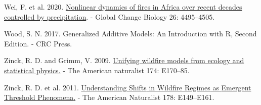 \documentclass[
]{article}
\newlength{\cslhangindent}
\newenvironment{CSLReferences}[2] %
 {\begin{list}{}{%
  \setlength{\itemindent}{0pt}
  \setlength{\leftmargin}{0pt}
  \setlength{\parsep}{0pt}
  \ifodd #1
   \setlength{\leftmargin}{\cslhangindent}
   \setlength{\itemindent}{-1\cslhangindent}
  \fi
  \setlength{\itemsep}{#2\baselineskip}}}
 {\end{list}}
\begin{document}
\begin{CSLReferences}{1}{1}
Wei, F. et al. 2020. \href{https://doi.org/10.1111/gcb.15190}{Nonlinear
dynamics of fires in {Africa} over recent decades controlled by
precipitation}. - Global Change Biology 26: 4495--4505.

Wood, S. N. 2017. Generalized {Additive Models}: {An Introduction} with
{R}, {Second Edition}. - {CRC Press}.

Zinck, R. D. and Grimm, V. 2009.
\href{https://doi.org/10.1086/605959}{Unifying wildfire models from
ecology and statistical physics.} - The American naturalist 174:
E170--85.

Zinck, R. D. et al. 2011.
\href{https://doi.org/10.1086/662675}{Understanding {Shifts} in
{Wildfire Regimes} as {Emergent Threshold Phenomena}.} - The American
Naturalist 178: E149--E161.

\end{CSLReferences}
\end{document}
